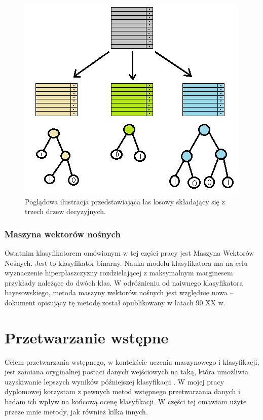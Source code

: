 \documentclass[../thesis.tex]{subfiles}
\begin{document}
\begin{figure}[h]
\centering
\includegraphics[height=.3\textheight]{random_forest.png}
\caption{Poglądowa ilustracja przedstawiająca las losowy składający się z trzech drzew decyzyjnych.}
\label{classification:random_forest}
\end{figure}

\subsubsection{Maszyna wektorów nośnych}

Ostatnim klasyfikatorem omówionym w tej części pracy jest Maszyna Wektorów Nośnych. Jest to klasyfikator binarny. Nauka modelu klasyfikatora ma na celu wyznaczenie hiperpłaszczyzny rozdzielającej z maksymalnym marginesem przykłady należące do dwóch klas. W odróżnieniu od naiwnego klasyfikatora bayesowskiego, metoda maszyny wektorów nośnych jest względnie nowa – dokument opisujący tę metodę został opublikowany w latach 90 XX w.

\section{Przetwarzanie wstępne}

Celem przetwarzania wstępnego, w kontekście uczenia maszynowego i klasyfikacji, jest zamiana oryginalnej postaci danych wejściowych na taką, która umożliwia uzyskiwanie lepszych wyników późniejszej klasyfikacji \cite{def_preprocessing}. W mojej pracy dyplomowej korzystam z pewnych metod wstępnego przetwarzania danych i badam ich wpływ na końcową ocenę klasyfikacji. W części tej omawiam użyte przeze mnie metody, jak również kilka innych.
\end{document}

